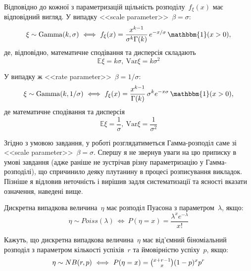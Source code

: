 \documentclass{mathreport}
\begin{document}
Відповідно до кожної з параметризацій щільність розподілу~$f_{\xi}(x)$ має відповідний вигляд. У випадку <<scale parameter>>~$\beta=\sigma:$ 
\begin{equation}\label{eq: dGamma scale parameter}
    \xi \sim \mathrm{Gamma}(k,\sigma) \ \Longleftrightarrow \ f_{\xi}(x) = \frac{x^{k-1}}{\sigma^{k}\Gamma(k)}\, e^{-x/\sigma}\, \mathbbm{1}(x>0), 
\end{equation}
де, відповідно, математичне сподівання та дисперсія складають
\begin{equation}\label{eq: dGamma scale parameter mean}
    \mathbb{E}\xi = k\sigma,\ \mathrm{Var}\xi=k\sigma^2
\end{equation}

У випадку ж <<rate parameter>>~$\beta=1/\sigma:$ 
\begin{equation}\label{eq: dGamma rate parameter}
    \xi \sim \mathrm{Gamma}(k,1/\sigma) \ \Longleftrightarrow \ f_{\xi}(x) = \frac{x^{k-1}}{\Gamma(k)}\,\sigma^{k} e^{-x\sigma}\, \mathbbm{1}(x>0), 
\end{equation}
де математичне сподівання та дисперсія
\begin{equation}\label{eq: dGamma rate parameter mean}
    \mathbb{E}\xi = \frac{1}{\sigma},\ \mathrm{Var}\xi=\frac{1}{\sigma^2}
\end{equation}

\begin{remark}
    Згідно з умовою завдання, у роботі розглядатиметься Гамма-розподіл саме зі <<scale parameter>>~$\beta=\sigma$. Спершу я не звернув уваги на цю приписку в умові завдання (адже раніше не зустрічав різну параметризацію у Гамма-розподілі), що спричинило деяку плутанину в процесі розписування викладок. Пізніше я відловив неточність і вирішив задля систематизації та ясності вказати означення, наведені вище.   
\end{remark}

Дискретна випадкова величина~$\eta$ має розподіл Пуасона з параметром~$\lambda$, якщо: 
\begin{equation}\label{eq: dPoisson}
    \eta \sim Poiss(\lambda) \ \Longleftrightarrow \ P(\eta=x) = \frac{\lambda^{x}e^{-\lambda}}{x!} 
\end{equation}

Кажуть, що дискретна випадкова величина~$\eta$ має від'ємний біноміальний розподіл з параметром кількості успіхів~$r$ та ймовірністю успіху~$p$, якщо: 
\begin{equation}\label{eq: dNB}
    \eta \sim NB(r,p) \ \Longleftrightarrow \ P(\eta=x) = \tbinom{x+r-1}{x}(1-p)^{x}p^{r}
\end{equation}
\end{document}
